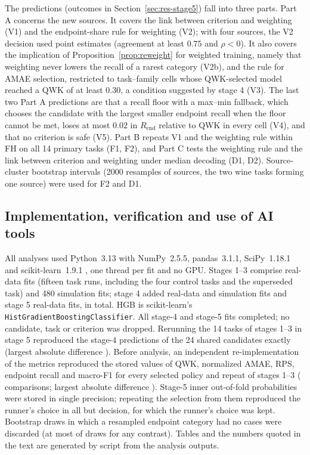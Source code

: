 \documentclass[pdflatex,sn-mathphys-ay]{sn-jnl}
\theoremstyle{thmstyleone}
\theoremstyle{thmstylethree}
\begin{document}
The predictions (outcomes in Section~\ref{sec:res-stage5}) fall into three parts. Part A concerns the new sources. It covers the link between criterion and weighting (V1) and the endpoint-share rule for weighting (V2); with four sources, the V2 decision used point estimates (agreement at least $0.75$ and $\rho<0$). It also covers the implication of Proposition~\ref{prop:reweight} for weighted training, namely that weighting never lowers the recall of a rarest category (V2b), and the rule for AMAE selection, restricted to task--family cells whose QWK-selected model reached a QWK of at least $0.30$, a condition suggested by stage 4 (V3). The last two Part A predictions are that a recall floor with a max--min fallback, which chooses the candidate with the largest smaller endpoint recall when the floor cannot be met, loses at most $0.02$ in $R_{\mathrm{end}}$ relative to QWK in every cell (V4), and that no criterion is safe (V5). Part B repeats V1 and the weighting rule within FH on all 14 primary tasks (F1, F2), and Part C tests the weighting rule and the link between criterion and weighting under median decoding (D1, D2). Source-cluster bootstrap intervals (2000 resamples of sources, the two wine tasks forming one source) were used for F2 and D1.

\subsection{Implementation, verification and use of AI tools}

All analyses used Python~3.13 with NumPy~2.5.5, pandas~3.1.1, SciPy~1.18.1 and scikit-learn~1.9.1 \citep{Pedregosa2011}, one thread per fit and no GPU. Stages 1--3 comprise \NRealFits{} real-data fits (fifteen task runs, including the four control tasks and the superseded task) and 480 simulation fits; stage 4 added \FitsStageFour{} real-data and \FitsSimFour{} simulation fits and stage 5 \FitsStageFive{} real-data fits, \FitsTotalAllFive{} in total. HGB is scikit-learn's \texttt{HistGradientBoostingClassifier}. All stage-4 and stage-5 fits completed; no candidate, task or criterion was dropped. Rerunning the 14 tasks of stages 1--3 in stage 5 reproduced the stage-4 predictions of the 24 shared candidates exactly (largest absolute difference \RoneDiff{}). Before analysis, an independent re-implementation of the metrics reproduced the stored values of QWK, normalized AMAE, RPS, endpoint recall and macro-F1 for every selected policy and repeat of stages 1--3 (\NRecompute{} comparisons; largest absolute difference \RecomputeMaxDiff{}). Stage-5 inner out-of-fold probabilities were stored in single precision; repeating the selection from them reproduced the runner's choice in all but \SchedMismatch{} decision, for which the runner's choice was kept. Bootstrap draws in which a resampled endpoint category had no cases were discarded (at most \BootDropMax{} of \NBoot{} draws for any contrast). Tables and the numbers quoted in the text are generated by script from the analysis outputs.
\end{document}
